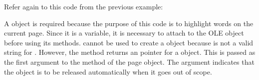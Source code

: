 \documentclass[letterpaper,12pt,english,openany,oneside]{sphinxmanual}
\begin{document}
Refer again to this code from the previous example:

\begin{sphinxVerbatim}[commandchars=\\\{\}]
 
 
\end{sphinxVerbatim}

A  object is required because the purpose of this code is to highlight words on the current page. Since it is a  variable, it is necessary to attach to the OLE object before using its methods.  cannot be used to create a  object because  is not a valid string for . However, the  method  returns an  pointer for a  object. This is passed as the first argument to the  method of the page object. The  argument indicates that the object is to be released automatically when it goes out of scope.

\begin{sphinxVerbatim}[commandchars=\\\{\}]
    
 
\end{sphinxVerbatim}
\end{document}
